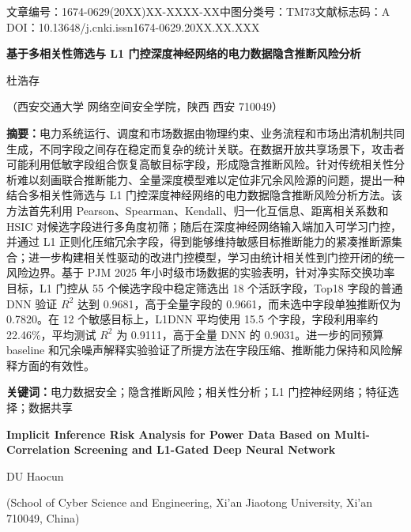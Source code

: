 \documentclass[UTF8,zihao=5,twoside]{ctexart}
\numberwithin{equation}{section}
\newcommand{\articleinfo}{文章编号：1674-0629(20XX)XX-XXXX-XX\quad 中图分类号：TM73\quad 文献标志码：A\\
DOI：10.13648/j.cnki.issn1674-0629.20XX.XX.XXX}
\begin{document}
\begin{center}
{\articleinfo}\par\vspace{1.0em}
{\sffamily{}\bfseries 基于多相关性筛选与 L1 门控深度神经网络的电力数据隐含推断风险分析}\par\vspace{0.8em}
{杜浩存}\par\vspace{0.4em}
{（西安交通大学 网络空间安全学院，陕西 西安 710049）}\par\vspace{0.8em}
\end{center}

\noindent\textbf{摘要：}电力系统运行、调度和市场数据由物理约束、业务流程和市场出清机制共同生成，不同字段之间存在稳定而复杂的统计关联。在数据开放共享场景下，攻击者可能利用低敏字段组合恢复高敏目标字段，形成隐含推断风险。针对传统相关性分析难以刻画联合推断能力、全量深度模型难以定位非冗余风险源的问题，提出一种结合多相关性筛选与 L1 门控深度神经网络的电力数据隐含推断风险分析方法。该方法首先利用 Pearson、Spearman、Kendall、归一化互信息、距离相关系数和 HSIC 对候选字段进行多角度初筛；随后在深度神经网络输入端加入可学习门控，并通过 L1 正则化压缩冗余字段，得到能够维持敏感目标推断能力的紧凑推断源集合；进一步构建相关性驱动的改进门控模型，学习由统计相关性到门控开闭的统一风险边界。基于 PJM 2025 年小时级市场数据的实验表明，针对净实际交换功率目标，L1 门控从 55 个候选字段中稳定筛选出 18 个活跃字段，Top18 字段的普通 DNN 验证 $R^2$ 达到 0.9681，高于全量字段的 0.9661，而未选中字段单独推断仅为 0.7820。在 12 个敏感目标上，L1DNN 平均使用 15.5 个字段，字段利用率约 22.46\%，平均测试 $R^2$ 为 0.9111，高于全量 DNN 的 0.9031。进一步的同预算 baseline 和冗余噪声解释实验验证了所提方法在字段压缩、推断能力保持和风险解释方面的有效性。\par
\noindent\textbf{关键词：}电力数据安全；隐含推断风险；相关性分析；L1 门控神经网络；特征选择；数据共享\par\vspace{0.8em}

\begin{center}
{\bfseries\large Implicit Inference Risk Analysis for Power Data Based on Multi-Correlation Screening and L1-Gated Deep Neural Network}\par\vspace{0.5em}
{DU Haocun}\par\vspace{0.3em}
{\small (School of Cyber Science and Engineering, Xi'an Jiaotong University, Xi'an 710049, China)}\par\vspace{0.5em}
\end{center}
\end{document}
